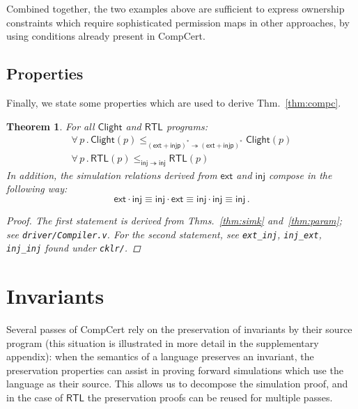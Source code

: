 \documentclass[draft,11pt]{report}
\newtheorem{theorem}{Theorem}
\newcommand{\kw}[1]{\ensuremath{ \mathsf{#1} }}
\begin{document}
Combined together,
the two examples above are sufficient to express
ownership constraints which require
sophisticated permission maps in other approaches,
by using conditions already present in CompCert.


\section{Properties} \label{sec:cklr-props} %

Finally,
we state some properties which are used
to derive Thm.~\ref{thm:compc}.

\begin{theorem} \label{thm:cklr-props}
For all $\kw{Clight}$ and $\kw{RTL}$ programs:
\begin{gather*}
\forall \, p \,.\,
  \kw{Clight}(p)
  \le_{(\kw{ext} + \kw{injp})^* \twoheadrightarrow (\kw{ext} + \kw{injp})^*}
  \kw{Clight}(p) \\
\forall \, p \,.\,
  \kw{RTL}(p)
  \le_{\kw{inj} \twoheadrightarrow \kw{inj}}
  \kw{RTL}(p)
\end{gather*}
In addition,
the simulation relations derived from $\kw{ext}$ and $\kw{inj}$
compose in the following way:
\[
  \kw{ext} \cdot \kw{inj} \equiv
  \kw{inj} \cdot \kw{ext} \equiv
  \kw{inj} \cdot \kw{inj} \equiv
  \kw{inj} \,.
\]
\begin{proof}
The first statement is derived from
Thms.~\ref{thm:simk} and~\ref{thm:param};
see \texttt{driver/Compiler.v}.
For the second statement, see
\texttt{ext\_inj}, \texttt{inj\_ext}, \texttt{inj\_inj}
found under \texttt{cklr/}.
\end{proof}
\end{theorem}



\chapter{Invariants} \label{sec:inv} %


Several passes of CompCert
rely on the preservation of invariants
by their source program
(this situation is illustrated in more detail in the supplementary
appendix):
when the semantics of a language preserves an invariant,
the preservation properties can assist
in proving forward simulations
which use the language as their source.
This allows us to decompose the simulation proof,
and in the case of $\kw{RTL}$
the preservation proofs can be reused for multiple passes.
\end{document}
